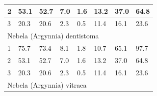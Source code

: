 \documentclass[12pt, a4paper]{article}
\begin{document}
\begin{table}[h]
{\begin{tabular}{|llllllll|}
\multicolumn{1}{|l|}{2}                                         & \multicolumn{1}{l|}{53.1}                        & \multicolumn{1}{l|}{52.7}         & \multicolumn{1}{l|}{7.0}                         & \multicolumn{1}{l|}{1.6}                 & \multicolumn{1}{l|}{13.2}                     & \multicolumn{1}{l|}{37.0}         & 64.8                               \\ \hline
\multicolumn{1}{|l|}{3}                                         & \multicolumn{1}{l|}{20.3}                        & \multicolumn{1}{l|}{20.6}         & \multicolumn{1}{l|}{2.3}                         & \multicolumn{1}{l|}{0.5}                 & \multicolumn{1}{l|}{11.4}                     & \multicolumn{1}{l|}{16.1}         & 23.6                               \\ \hline
\multicolumn{8}{|l|}{Nebela (Argynnia) dentistoma}                                                                                                                                                                                                                                                                                                                            \\ \hline
\multicolumn{1}{|l|}{1}                                         & \multicolumn{1}{l|}{75.7}                        & \multicolumn{1}{l|}{73.4}         & \multicolumn{1}{l|}{8.1}                         & \multicolumn{1}{l|}{1.8}                 & \multicolumn{1}{l|}{10.7}                     & \multicolumn{1}{l|}{65.1}         & 97.7                               \\ \hline
\multicolumn{1}{|l|}{2}                                         & \multicolumn{1}{l|}{53.1}                        & \multicolumn{1}{l|}{52.7}         & \multicolumn{1}{l|}{7.0}                         & \multicolumn{1}{l|}{1.6}                 & \multicolumn{1}{l|}{13.2}                     & \multicolumn{1}{l|}{37.0}         & 64.8                               \\ \hline
\multicolumn{1}{|l|}{3}                                         & \multicolumn{1}{l|}{20.3}                        & \multicolumn{1}{l|}{20.6}         & \multicolumn{1}{l|}{2.3}                         & \multicolumn{1}{l|}{0.5}                 & \multicolumn{1}{l|}{11.4}                     & \multicolumn{1}{l|}{16.1}         & 23.6                               \\ \hline
\multicolumn{8}{|l|}{Nebela (Argynnia) vitraea}                                                                                                                                                                                                                                                                                                                               \\ \hline

\end{tabular}}
\end{table}
\end{document}
